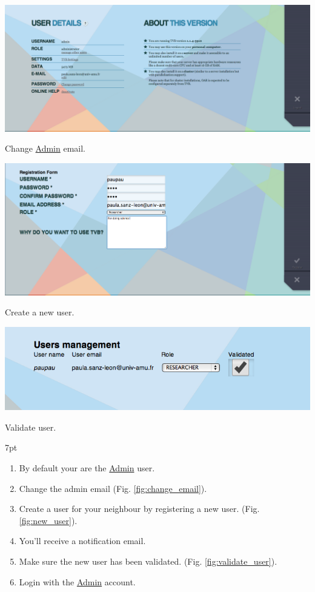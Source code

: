 \documentclass{tufte-handout}
\newenvironment{formal}{%
  \def\FrameCommand{%
    \hspace{1pt}%
    {\color{DarkBlue}\vrule width 2pt}%
    {\color{formalshade}\vrule width 4pt}%
    \colorbox{formalshade}%
  }%
  \MakeFramed{\advance\hsize-\width\FrameRestore}%
  \noindent\hspace{-4.55pt}%
  \begin{adjustwidth}{}{7pt}%
  \vspace{2pt}\vspace{2pt}%
}
{%
  \vspace{2pt}\end{adjustwidth}\endMakeFramed%
}
\begin{document}
\begin{marginfigure}
  \includegraphics[width=\linewidth]{Handout_UI_LinkAndShare_ChangeAdminEmail}%
  \caption{Change \underline{Admin} email.}%
  \label{fig:change_email}%
\end{marginfigure}

\begin{marginfigure}
  \includegraphics[width=\linewidth]{Handout_UI_LinkAndShare_AddNewUser}%
  \caption{Create a new user.}%
  \label{fig:new_user}%
\end{marginfigure}

\begin{marginfigure}
  \includegraphics[width=\linewidth]{Handout_UI_LinkAndShare_ValidateNewUser}%
  \caption{Validate user.}%
  \label{fig:validate_user}%
\end{marginfigure}

\begin{formal}
\begin{enumerate}
\item By default your are the \underline{Admin} user. 
\item Change the admin email (Fig. \ref{fig:change_email}).
\item Create a user for your neighbour by registering a new user. (Fig. \ref{fig:new_user}). 
\item You'll receive a notification email.
\item Make sure the new user has been validated. (Fig. \ref{fig:validate_user}).
\item Login with the \underline{Admin} account. 
\end{enumerate}
\end{formal}
\end{document}
